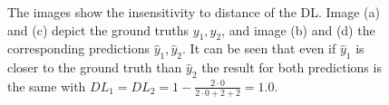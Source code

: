 \begin{figure}[H]
  \caption[Distance insensitivity of \ac{DL}]{The images show the insensitivity to distance of the \ac{DL}. Image (a) and (c) depict the ground truths $y_1,y_2$, and image (b) and (d) the corresponding predictions $\hat{y}_1,\hat{y}_2$. It can be seen that even if $\hat{y}_1$ is closer to the ground truth than $\hat{y}_2$ the result for both predictions is the same with $DL_1=DL_2=1-\frac{2\cdot 0}{2\cdot 0 + 2 + 2}=1.0$.}
  \label{dice_limit_1}
\end{figure}
